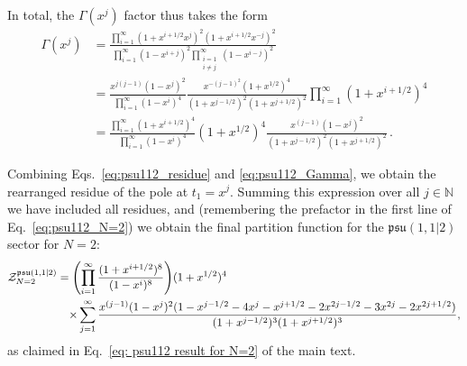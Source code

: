 \documentclass[a4paper,11pt]{article}
\DeclareMathOperator{\phaneq}{\phantom{{}=}}
\begin{document}
In total, the $\Gamma(x^j)$ factor thus takes the form
\begin{equation}\label{eq:psu112_Gamma}
\begin{split}
	\Gamma(x^j) &= \frac{ \prod_{i=1}^\infty (1+x^{i+1/2}x^j)^2(1+x^{i+1/2}x^{-j})^2 }{ \prod_{i=1}^\infty (1-x^{i+j})^2 \prod_{\substack{i=1\\i\neq j}}^\infty (1-x^{i-j})^2 }\\
	&= \frac{x^{j(j-1)}(1-x^j)^2}{\prod_{i=1}^\infty (1-x^i)^4}  \frac{x^{-(j-1)^2} (1+x^{1/2})^4}{(1+x^{j-1/2})^2(1+x^{j+1/2})^2} \prod_{i=1}^\infty (1+x^{i+1/2})^4\\
	&= \frac{\prod_{i=1}^\infty (1+x^{i+1/2})^4}{\prod_{i=1}^\infty (1-x^i)^4}  (1+x^{1/2})^4  \frac{x^{(j-1)} (1-x^j)^2}{(1+x^{j-1/2})^2(1+x^{j+1/2})^2} \,.
\end{split}
\end{equation}

Combining Eqs.\ \eqref{eq:psu112_residue} and \eqref{eq:psu112_Gamma}, we obtain the rearranged residue of the pole at $t_1=x^j$. Summing this expression over all $j\in \mathbb{N}$ we have included all residues, and (remembering the prefactor in the first line of Eq.\ \eqref{eq:psu112_N=2}) we obtain the final partition function for the $\mathfrak{psu}(1,1|2)$ sector for $N=2$:
\begin{equation}
\label{eq: psu112 result for N=2 appendix}
\begin{split}
	\mathcal{Z}_{N=2}^{\mathfrak{psu}(1,1|2)} &= \qty(\prod_{i=1}^\infty\frac{(1+x^{i+1/2})^{8}}{(1-x^{i})^8}) (1+x^{1/2})^4 \\
	&\!\!\phaneq\times \sum_{j=1}^\infty \frac{x^{(j-1)}(1-x^j)^2 (1-x^{j-1/2}-4x^j-x^{j+1/2}-2x^{2j-1/2}-3x^{2j}-2x^{2j+1/2})}{(1+x^{j-1/2})^3(1+x^{j+1/2})^3}\,\!, 
\end{split}
\end{equation}
as claimed in Eq.\ \eqref{eq: psu112 result for N=2} of the main text.





\end{document}
